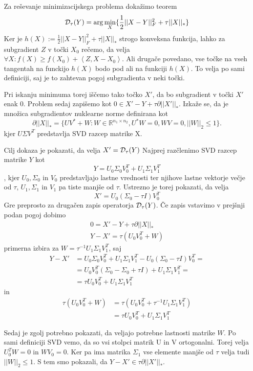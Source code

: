 Za reševanje minimizacijskega problema dokažimo teorem
\[
    \mathcal{D}_\tau(Y) = \arg \min_{X} \{ \frac{1}{2} ||X - Y||^2_F + \tau||X||_* \}
\]
Ker je $h(X) := \frac{1}{2} ||X - Y||^2_F + \tau||X||_*$ strogo konveksna funkcija, lahko za subgradient $Z$ v točki $X_0$ rečemo, da velja $\forall X: f(X) \geq  f(X_0) + \left< Z, X - X_0 \right>$. Ali drugače povedano, vse točke na vseh tangentah na funckijo $h(X)$ bodo pod ali na funkciji $h(X)$. To velja po sami definiciji, saj je to zahtevan pogoj subgradienta v neki točki.

Pri iskanju minimuma torej iščemo tako točko $X'$, da bo subgradient v točki $X'$ enak 0. Problem sedaj zapišemo kot $0 \in X' - Y + \tau \partial||X'||_*$. Izkaže se, da je množica subgradientov nuklearne norme definirana kot
\[
    \partial||X||_* = \{UV^* + W: W \in \mathbb{R}^{n_1 \times n_2}, U^*W = 0, WV = 0, ||W||_2 \leq 1 \}.
\] 
kjer $U \Sigma V^T$ predstavlja SVD razcep matrike X.

Cilj dokaza je pokazati, da velja $X' = \mathcal{D}_\tau(Y)$ Najprej razčlenimo SVD razcep matrike $Y$ kot 
\[
    Y = U_0\Sigma_0V_0^T + U_1\Sigma_1V_1^T
\],
kjer $U_0, \Sigma_0$ in $V_0$ predstavljajo lastne vrednosti ter njihove lastne vektorje večje od $\tau$, $U_1, \Sigma_1$ in $V_1$ pa tiste manjše od $\tau$. Ustrezno je torej pokazati, da velja 
\[
    X' = U_0(\Sigma_0 - \tau I)V_0^T
\] Gre preprosto za drugačen zapis operatorja $\mathcal{D}_\tau(Y)$.
Če zapis vstavimo v prejšnji podan pogoj dobimo
\begin{align*}
    0 = X' - Y + \tau \partial ||X||_*\\
    Y- X' = \tau (U_0 V_0^T + W)
\end{align*}
primerna izbira za $W = \tau^{-1} U_1 \Sigma_1 V_1^T$, saj
\begin{align*}
    Y-X' &= U_0\Sigma_0V_0^T + U_1\Sigma_1V_1^T - U_0(\Sigma_0 - \tau I)V_0^T =\\ 
    &= U_0V_0^T(\Sigma_0 - \Sigma_0 + \tau I) + U_1\Sigma_1 V_1^T = \\
    &= \tau U_0 V_0^T + U_1\Sigma_1 V_1^T
\end{align*}
in 
\begin{align*}
    \tau(U_0 V_0^T + W) &= \tau(U_0V_0^T + \tau^{-1} U_1 \Sigma_1 V_1^T)\\ 
    &= \tau U_0 V_0^T + U_1 \Sigma_1 V_1^T 
\end{align*}

Sedaj je zgolj potrebno pokazati, da veljajo potrebne lastnosti matrike $W$.
 Po sami definiciji SVD vemo, da so vsi stolpci matrik U in V ortogonalni. Torej velja $U_0^TW = 0$ in $WV_0 = 0$. Ker pa ima matrika $\Sigma_1$ vse elemente manjše od $\tau$ velja tudi $||W||_2 \leq 1$. S tem smo pokazali, da $Y - X' \in \tau \partial ||X'||_*$.

